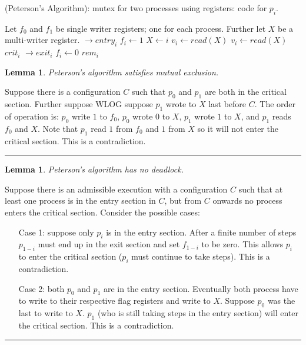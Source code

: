 \documentclass[twoside]{article}
\newtheorem{lemma}[theorem]{Lemma}
\newenvironment{proof}{{\bf Proof:}}{\hfill\rule{2mm}{2mm}}
\begin{document}
\begin{algorithm}
	\caption{(Peterson's Algorithm): mutex for two processes using registers: code for $p_i$.}
    \label{pseudocode:mutex2R}
    \begin{algorithmic}[1]
    \State Let $f_0$ and $f_1$ be single writer registers; one for each process. Further let $X$ be a multi-writer register.
    \State $\rightarrow entry_i$
	\State $f_i \leftarrow 1$
	\State $X \leftarrow i$
	\State $v_i \leftarrow read(X)$
		\State $v_i \leftarrow read(X)$
	\EndWhile
	\State $crit_i$
	\State
	\State $\rightarrow exit_i$
	\State $f_i \leftarrow 0$
	\State $rem_i$
	\end{algorithmic}
\end{algorithm}

\begin{lemma}
Peterson's algorithm satisfies mutual exclusion.
\end{lemma}
\begin{proof}
Suppose there is a configuration $C$ such that $p_0$ and $p_1$ are both in the critical section. Further suppose WLOG suppose $p_1$ wrote to $X$ last before $C$. The order of operation is: $p_0$ write $1$ to $f_0$, $p_0$ wrote $0$ to $X$, $p_1$ wrote $1$ to $X$, and $p_1$ reads $f_0$ and $X$. Note that $p_1$ read $1$ from $f_0$ and $1$ from $X$ so it will not enter the critical section. This is a contradiction. 
\end{proof}

\begin{lemma}
\label{lem:petnodeadlock}
Peterson's algorithm has no deadlock.
\end{lemma}
\begin{proof}
Suppose there is an admissible execution with a configuration $C$ such that at least one process is in the entry section in $C$, but from $C$ onwards no process enters the critical section. Consider the possible cases:
\begin{enumerate}
\item[Case 1:] suppose only $p_i$ is in the entry section. After a finite number of steps $p_{1-i}$ must end up in the exit section and set $f_{1-i}$ to be zero. This allows $p_i$ to enter the critical section ($p_i$ must continue to take steps). This is a contradiction.
\item[Case 2:] both $p_0$ and $p_1$ are in the entry section. Eventually both process have to write to their respective flag registers and write to $X$. Suppose $p_0$ was the last to write to $X$. $p_1$ (who is still taking steps in the entry section) will enter the critical section. This is a contradiction.
\end{enumerate}
\end{proof}
\end{document}
